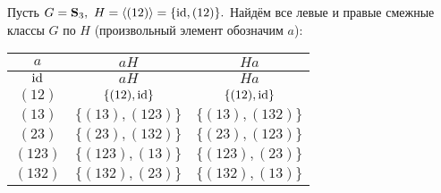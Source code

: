 	\begin{exmpl*}
		Пусть $G = \mathbf{S}_3, \ H = \langle(12)\rangle = \{\mathrm{id}, (12)\}.$ Найдём все левые и правые смежные классы $G$ по $H$ (произвольный элемент обозначим $a$):
		\begin{center}
			\begin{tabular}{c|c|c}
				$a$ & $aH$ & $Ha$\\
				\hline
				$\mathrm{id}$ & $aH$ & $Ha$ \\
				\hline
				$(12)$ & $\{(12), \mathrm{id}\}$ & $\{(12), \mathrm{id}\}$ \\
				\hline
				$(13)$ & $\{(13), (123)\}$ & $\{(13), (132)\}$ \\
				\hline
				$(23)$ & $\{(23), (132)\}$ & $\{(23), (123)\}$ \\
				\hline
				$(123)$ & $\{(123), (13)\}$ & $\{(123), (23)\}$ \\
				\hline
				$(132)$ & $\{(132), (23)\}$ & $\{(132), (13)\}$
			\end{tabular}
		\end{center} \n
	\end{exmpl*}